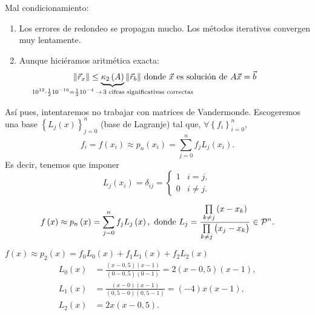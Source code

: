 \noindent Mal condicionamiento:
\begin{enumerate}[1)]
    \item Los errores de redondeo se propagan mucho. Los métodos iterativos convergen muy lentamente.
    \item Aunque hiciéramos aritmética exacta:
        \[
            \|\vec{r}_x\| \leq \underbrace{\kappa_2 \left( A \right)}_{\mathclap{10^{12}\cdot \frac{1}{2}10^{-16} = \frac{1}{2}10^{-4} \,\rightarrow\, 3\text{ cifras significativas correctas}}} \|\vec{r}_b\|\text{ donde }\vec{x}\text{ es solución de }A\vec{x} = \vec{b}
        \]
\end{enumerate}

\noindent Así pues, intentaremos no trabajar con matrices de Vandermonde. Escogeremos una base $\left\{ L_j\left( x \right) \right\}^n_{j=0}$ (base de Lagranje) tal que, $\forall \left\{ f_i \right\}^n_{i=0}$,
\[
    f_i = f\left( x_i \right) \approx p_n\left( x_i \right) = \sum^n_{j=0} f_jL_j\left( x_i \right).
\]
Es decir, tenemos que imponer
\[
    L_j\left( x_i \right) = \delta_{ij} =
    \begin{cases}
        1 & i=j, \\
        0 & i\neq j.
    \end{cases}
\]

\begin{defi}
    \[
        f\left( x \right) \approx p_n\left( x \right) = \sum_{j=0}^{n} f_jL_j\left( x \right), \text{ donde } L_j = \frac{\prod\limits_{k\neq j}\left( x-x_k \right)}{\prod\limits_{k\neq j}\left( x_j - x_k \right)} \in \mathcal{P}^n.
    \]
\end{defi}

\begin{example} %
    $f\left( x \right)\approx p_2\left( x \right) = f_0L_0\left( x \right) + f_1L_1\left( x \right) + f_2L_2\left( x \right)$
    \begin{align*}
        L_0\left( x \right) &= \frac{\left( x-0,5 \right)\left( x-1 \right)}{\left( 0-0,5 \right)\left( 0-1 \right)} = 2\left( x-0,5 \right)\left( x-1 \right),\\
        L_1\left( x \right) &= \frac{\left( x-0 \right)\left( x-1 \right)}{\left( 0,5-0 \right)\left( 0,5-1 \right)} = \left( -4 \right)x\left( x-1 \right),\\
        L_2\left( x \right) &= 2x\left( x-0,5 \right).
    \end{align*}
\end{example}

